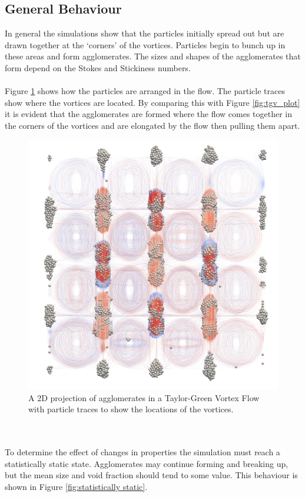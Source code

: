 \documentclass[a4paper,11pt,titlepage]{report}
\begin{document}
\subsection{General Behaviour}
In general the simulations show that the particles initially spread out but are drawn together at the `corners' of the vortices. Particles begin to bunch up in these areas and form agglomerates. The sizes and shapes of the agglomerates that form depend on the Stokes and Stickiness numbers.
\\\\Figure \ref{fig:agglomerate locations} shows how the particles are arranged in the flow. The particle traces show where the vortices are located. By comparing this with Figure \ref{fig:tgv_plot} it is evident that the agglomerates are formed where the flow comes together in the corners of the vortices and are elongated by the flow then pulling them apart.
\begin{figure}[!htb]
\centering
\includegraphics[scale=0.6]{figures/low_stokes_agglomerates.png}
\caption{A 2D projection of agglomerates in a Taylor-Green Vortex Flow with particle traces to show the locations of the vortices.}
\label{fig:agglomerate locations}
\end{figure}
\\\\To determine the effect of changes in properties the simulation must reach a statistically static state. Agglomerates may continue forming and breaking up, but the mean size and void fraction should tend to some value. This behaviour is shown in Figure \ref{fig:statistically static}.
\end{document}
